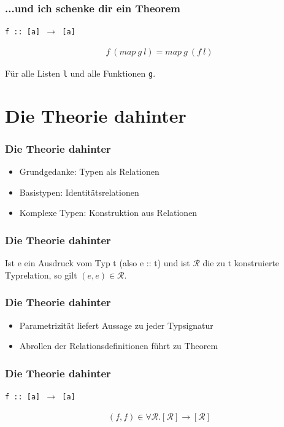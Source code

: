 \documentclass{beamer}
\begin{document}
\begin{frame}
\frametitle{...und ich schenke dir ein Theorem}
\texttt{f :: [a] $\rightarrow$ [a]}

\begin{align*}
f\ (map\ g\ l) = map\ g\ (f\ l)
\end{align*}

Für alle Listen \texttt{l} und alle Funktionen \texttt{g}.

\end{frame}

\section{Die Theorie dahinter}
\begin{frame}
\frametitle{Die Theorie dahinter}

\begin{itemize}
\item Grundgedanke: Typen als Relationen
\item Basistypen: Identitätsrelationen
\item Komplexe Typen: Konstruktion aus Relationen
\end{itemize}

\end{frame}

\begin{frame}
\frametitle{Die Theorie dahinter}

\begin{Theorem}[Parametrizität]
Ist e ein Ausdruck vom Typ t (also e :: t) und ist $\mathcal{R}$ die zu t konstruierte Typrelation, so gilt
$(e, e) \in \mathcal{R}$.
\end{Theorem}

\end{frame}

\begin{frame}
\frametitle{Die Theorie dahinter}

\begin{itemize}
\item Parametrizität liefert Aussage zu jeder Typsignatur
\item Abrollen der Relationsdefinitionen führt zu Theorem
\end{itemize}

\end{frame}

\begin{frame}
\frametitle{Die Theorie dahinter}

\texttt{f :: [a] $\rightarrow$ [a]}

\begin{align*}
(f, f) \in \forall \mathcal{R} . [\mathcal{R}] \rightarrow [\mathcal{R}]
\end{align*}

\end{frame}
\end{document}

